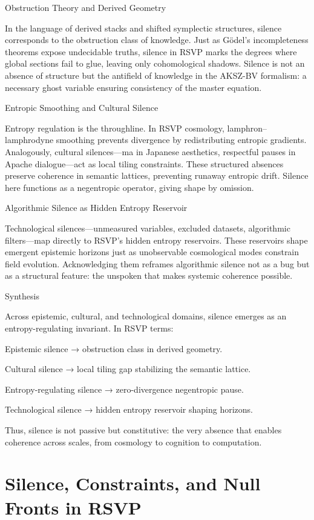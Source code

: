 \documentclass[11pt,a4paper]{article}
\begin{document}
Obstruction Theory and Derived Geometry

In the language of derived stacks and shifted symplectic structures, silence corresponds to the obstruction class of knowledge. Just as Gödel’s incompleteness theorems expose undecidable truths, silence in RSVP marks the degrees where global sections fail to glue, leaving only cohomological shadows. Silence is not an absence of structure but the antifield of knowledge in the AKSZ-BV formalism: a necessary ghost variable ensuring consistency of the master equation.

Entropic Smoothing and Cultural Silence

Entropy regulation is the throughline. In RSVP cosmology, lamphron–lamphrodyne smoothing prevents divergence by redistributing entropic gradients. Analogously, cultural silences—ma in Japanese aesthetics, respectful pauses in Apache dialogue—act as local tiling constraints. These structured absences preserve coherence in semantic lattices, preventing runaway entropic drift. Silence here functions as a negentropic operator, giving shape by omission.

Algorithmic Silence as Hidden Entropy Reservoir

Technological silences—unmeasured variables, excluded datasets, algorithmic filters—map directly to RSVP’s hidden entropy reservoirs. These reservoirs shape emergent epistemic horizons just as unobservable cosmological modes constrain field evolution. Acknowledging them reframes algorithmic silence not as a bug but as a structural feature: the unspoken that makes systemic coherence possible.

Synthesis

Across epistemic, cultural, and technological domains, silence emerges as an entropy-regulating invariant. In RSVP terms:

Epistemic silence → obstruction class in derived geometry.

Cultural silence → local tiling gap stabilizing the semantic lattice.

Entropy-regulating silence → zero-divergence negentropic pause.

Technological silence → hidden entropy reservoir shaping horizons.

Thus, silence is not passive but constitutive: the very absence that enables coherence across scales, from cosmology to cognition to computation.

\section{Silence, Constraints, and Null Fronts in RSVP}
\label{app:b}
\end{document}
